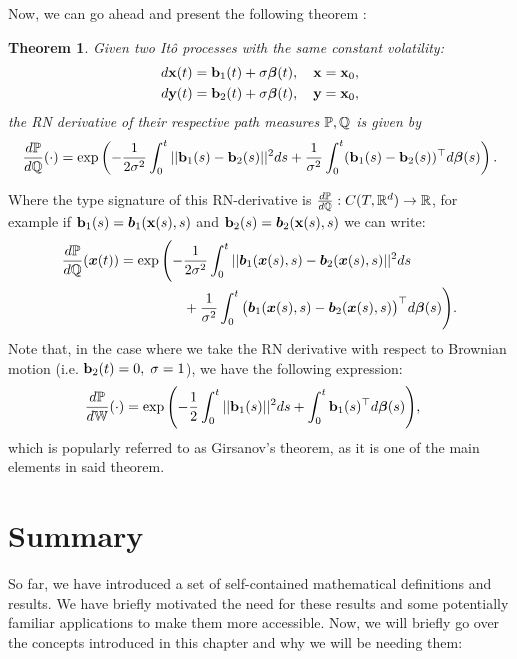 \documentclass[a4paper,12pt,twoside,openright]{report}
\newtheorem{theorem}{Theorem}
\theoremstyle{definition}
\begin{document}
Now, we can go ahead and present the following theorem \citep{sarkka2019applied}:
\begin{theorem}\label{thrm:ito_ratio}\citep{sarkka2019applied}
Given two Itô processes with the same constant volatility: 
    \begin{align*}
        d{\mathbf{x}}(t) = {\mathbf{b}}_1(t) + \sigma {\bm{\beta}}(t), \quad {\mathbf{x}} = {\mathbf{x}}_0, \\
        d{\mathbf{y}}(t) = {\mathbf{b}}_2(t) + \sigma{\bm{\beta}}(t), \quad {\mathbf{y}} = {\mathbf{x}}_0,
    \end{align*}
the RN derivative of their respective path measures ${\mathbb{P}},{\mathbb{Q}}$ is given by
\begin{align} \label{eq:girsanov}
    \frac{d{\mathbb{P}}}{d{\mathbb{Q}}}(\cdot) = \exp\left(-\frac{1}{2\sigma^2}\int_0^t ||{\mathbf{b}}_1(s) - {\mathbf{b}}_2(s)||^2 ds + \frac{1}{\sigma^2}\int_0^t ({\mathbf{b}}_1(s) - {\mathbf{b}}_2(s))^{\top}d{\bm{\beta}}(s) \right).
\end{align}
\end{theorem}
Where the type signature of this RN-derivative is $\frac{d{\mathbb{P}}}{d{\mathbb{Q}}}: C(T, {\mathbb{R}}^d) \rightarrow {\mathbb{R}}$, for example if  ${\mathbf{b}}_1(s)={\bm{b}}_1({\mathbf{x}}(s), s)$ and ${\mathbf{b}}_2(s)={\bm{b}}_2({\mathbf{x}}(s), s)$ we can write:
\begin{align*}
    \frac{d{\mathbb{P}}}{d{\mathbb{Q}}}({\bm{x}}(t)) = \exp\Bigg(-&\frac{1}{2\sigma^2}\int_0^t ||{\bm{b}}_1({\bm{x}}(s), s) - {\bm{b}}_2({\bm{x}}(s), s)||^2 ds \\ 
    &+ \frac{1}{\sigma^2}\int_0^t \big({\bm{b}}_1({\bm{x}}(s), s) - {\bm{b}}_2({\bm{x}}(s), s)\big)^{\top}d{\bm{\beta}}(s) \Bigg).
\end{align*}
Note that, in the case where we take the RN derivative with respect to Brownian motion (i.e. ${\mathbf{b}}_2(t) =0, \; \sigma=1$), we have the following expression:
\begin{align} \label{eq:girsanov_0}
    \frac{d{\mathbb{P}}}{d\mathbb{W}}(\cdot) = \exp\Bigg(-&\frac{1}{2}\int_0^t ||{\mathbf{b}}_1(s) ||^2 ds+ \int_0^t {\mathbf{b}}_1(s)^{\top}d{\bm{\beta}}(s) \Bigg),
\end{align}
which is popularly referred to as Girsanov's theorem, as it is one of the main elements in said theorem.

\section{Summary }

So far, we have introduced a set of self-contained mathematical definitions and results. We have briefly motivated the need for these results and some potentially familiar applications to make them more accessible. Now, we will briefly go over the concepts introduced in this chapter and why we will be needing them:
\end{document}
